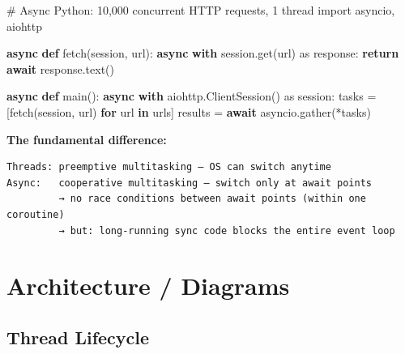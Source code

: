 \documentclass[11pt]{article}
\newenvironment{Shaded}{\begin{snugshade}}{\end{snugshade}}
\newcommand{\CommentTok}[1]{\textcolor[rgb]{0.48,0.49,0.49}{#1}}
\newcommand{\ControlFlowTok}[1]{\textcolor[rgb]{0.99,0.74,0.29}{\textbf{#1}}}
\newcommand{\ImportTok}[1]{\textcolor[rgb]{0.15,0.68,0.38}{#1}}
\newcommand{\KeywordTok}[1]{\textcolor[rgb]{0.81,0.81,0.76}{\textbf{#1}}}
\newcommand{\NormalTok}[1]{\textcolor[rgb]{0.81,0.81,0.76}{#1}}
\newcommand{\OperatorTok}[1]{\textcolor[rgb]{0.81,0.81,0.76}{#1}}
\begin{document}

\begin{Shaded}
\begin{Highlighting}[]
\CommentTok{\# Async Python: 10,000 concurrent HTTP requests, 1 thread}
\ImportTok{import}\NormalTok{ asyncio, aiohttp}

\ControlFlowTok{async} \KeywordTok{def}\NormalTok{ fetch(session, url):}
    \ControlFlowTok{async} \ControlFlowTok{with}\NormalTok{ session.get(url) }\ImportTok{as}\NormalTok{ response:}
        \ControlFlowTok{return} \ControlFlowTok{await}\NormalTok{ response.text()}

\ControlFlowTok{async} \KeywordTok{def}\NormalTok{ main():}
    \ControlFlowTok{async} \ControlFlowTok{with}\NormalTok{ aiohttp.ClientSession() }\ImportTok{as}\NormalTok{ session:}
\NormalTok{        tasks }\OperatorTok{=}\NormalTok{ [fetch(session, url) }\ControlFlowTok{for}\NormalTok{ url }\KeywordTok{in}\NormalTok{ urls]}
\NormalTok{        results }\OperatorTok{=} \ControlFlowTok{await}\NormalTok{ asyncio.gather(}\OperatorTok{*}\NormalTok{tasks)}
\end{Highlighting}
\end{Shaded}

\textbf{The fundamental difference:}

\setcodelang{}

\begin{verbatim}
Threads: preemptive multitasking — OS can switch anytime
Async:   cooperative multitasking — switch only at await points
         → no race conditions between await points (within one coroutine)
         → but: long-running sync code blocks the entire event loop
\end{verbatim}

\section{Architecture / Diagrams}\label{architecture--diagrams}

\subsection{Thread Lifecycle}\label{thread-lifecycle}

\setcodelang{}
\end{document}
